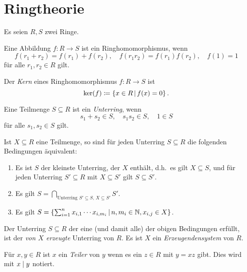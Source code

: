 \chapter{Ringtheorie}

Es seien $R, S$ zwei Ringe.

\begin{definition}
  Eine Abbildung $f \colon R \to S$ ist ein Ringhomomorphismus, wenn
  \[
      f(r_1 + r_2)
    = f(r_1) + f(r_2),
    \quad
      f(r_1 r_2)
    = f(r_1) f(r_2),
    \quad
      f(1) = 1
  \]
  für alle $r_1, r_2 \in R$ gilt.
\end{definition}

\begin{definition}
  Der \emph{Kern} eines Ringhomomorphismus $f \colon R \to S$ ist
  \[
              \ker(f)
    \defined  \{ x \in R \suchthat f(x) = 0 \} \,.
  \]
\end{definition}

\begin{definition}
  Eine Teilmenge $S \subseteq R$ ist ein \emph{Unterring}, wenn
  \[
    s_1 + s_2 \in S,
    \quad
    s_1 s_2 \in S,
    \quad
    1 \in S
  \]
  für alle $s_1, s_2 \in S$ gilt.
\end{definition}

Ist $X \subseteq R$ eine Teilmenge, so sind für jeden Unterring $S \subseteq R$ die folgenden Bedingungen äquivalent:

\begin{enumerate}
  \item
    Es ist $S$ der kleinste Unterring, der $X$ enthält, d.h.\ es gilt $X \subseteq S$, und für jeden Unterring $S' \subseteq R$ mit $X \subseteq S'$ gilt $S \subseteq S'$.
  \item
    Es gilt $S = \bigcap_{\text{Unterring $S' \subseteq S$, $X \subseteq S'$}} S'$.
  \item
    Es gilt $S = \{ \sum_{i=1}^n x_{i,1} \dotsm x_{i,m_i} \suchthat n, m_i \in \Natural, x_{i,j} \in X \}$.
\end{enumerate}

\begin{definition}
  Der Unterring $S \subseteq R$ der eine \textup(und damit alle\textup) der obigen Bedingungen erfüllt, ist der \emph{von $X$ erzeugte} Unterring von $R$.
  Es ist $X$ ein \emph{Erzeugendensystem} von $R$.
\end{definition}


\begin{definition}
  Für $x, y \in R$ ist $x$ ein \emph{Teiler} von $y$ wenn es ein $z \in R$ mit $y = xz$ gibt.
  Dies wird mit $x \mathrel{|} y$ notiert.
\end{definition}





